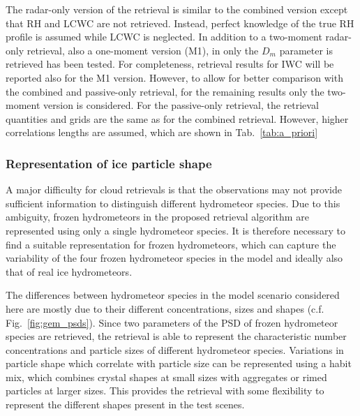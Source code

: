 \documentclass[journal abbreviation, manuscript]{copernicus}
\begin{document}
The radar-only version of the retrieval is similar to the combined version
except that RH and LCWC are not retrieved. Instead, perfect knowledge of the
true RH profile is assumed while LCWC is neglected. In addition to a two-moment
radar-only retrieval, also a one-moment version (M1), in only the $D_m$
parameter is retrieved has been tested. For completeness, retrieval results for
IWC will be reported also for the M1 version. However, to allow for better
comparison with the combined and passive-only retrieval, for the remaining
results only the two-moment version is considered. For the passive-only
retrieval, the retrieval quantities and grids are the same as for the combined
retrieval. However, higher correlations lengths are assumed, which are shown in
Tab.~\ref{tab:a_priori}

\subsubsection{Representation of ice particle shape}
\label{sec:method:partilce_models}

A major difficulty for cloud retrievals is that the observations may not provide
sufficient information to distinguish different hydrometeor species. Due to this
ambiguity, frozen hydrometeors in the proposed retrieval algorithm are
represented using only a single hydrometeor species. It is therefore necessary
to find a suitable representation for frozen hydrometeors, which can capture the
variability of the four frozen hydrometeor species in the model and ideally also
that of real ice hydrometeors.

The differences between hydrometeor species in the model scenario considered
here are mostly due to their different concentrations, sizes and shapes (c.f.
Fig.~\ref{fig:gem_psds}). Since two parameters of the PSD of frozen hydrometeor
species are retrieved, the retrieval is able to represent the characteristic
number concentrations and particle sizes of different hydrometeor species.
Variations in particle shape which correlate with particle size can be
represented using a habit mix, which combines crystal shapes at small sizes with
aggregates or rimed particles at larger sizes. This provides the retrieval with
some flexibility to represent the different shapes present in the test scenes.
\end{document}

